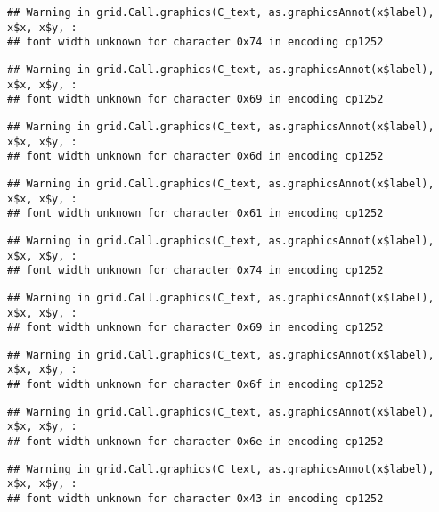 \documentclass[
]{article}
\begin{document}
\begin{verbatim}
## Warning in grid.Call.graphics(C_text, as.graphicsAnnot(x$label), x$x, x$y, :
## font width unknown for character 0x74 in encoding cp1252
\end{verbatim}

\begin{verbatim}
## Warning in grid.Call.graphics(C_text, as.graphicsAnnot(x$label), x$x, x$y, :
## font width unknown for character 0x69 in encoding cp1252
\end{verbatim}

\begin{verbatim}
## Warning in grid.Call.graphics(C_text, as.graphicsAnnot(x$label), x$x, x$y, :
## font width unknown for character 0x6d in encoding cp1252
\end{verbatim}

\begin{verbatim}
## Warning in grid.Call.graphics(C_text, as.graphicsAnnot(x$label), x$x, x$y, :
## font width unknown for character 0x61 in encoding cp1252
\end{verbatim}

\begin{verbatim}
## Warning in grid.Call.graphics(C_text, as.graphicsAnnot(x$label), x$x, x$y, :
## font width unknown for character 0x74 in encoding cp1252
\end{verbatim}

\begin{verbatim}
## Warning in grid.Call.graphics(C_text, as.graphicsAnnot(x$label), x$x, x$y, :
## font width unknown for character 0x69 in encoding cp1252
\end{verbatim}

\begin{verbatim}
## Warning in grid.Call.graphics(C_text, as.graphicsAnnot(x$label), x$x, x$y, :
## font width unknown for character 0x6f in encoding cp1252
\end{verbatim}

\begin{verbatim}
## Warning in grid.Call.graphics(C_text, as.graphicsAnnot(x$label), x$x, x$y, :
## font width unknown for character 0x6e in encoding cp1252
\end{verbatim}

\begin{verbatim}
## Warning in grid.Call.graphics(C_text, as.graphicsAnnot(x$label), x$x, x$y, :
## font width unknown for character 0x43 in encoding cp1252
\end{verbatim}
\end{document}
